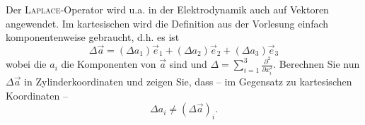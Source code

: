 \begin{atiTask}[
  title = Laplaceoperator in 3 Dimensionen
]

Der \textsc{Laplace}-Operator wird u.a. in der Elektrodynamik auch auf Vektoren angewendet. Im kartesischen wird die Definition aus der Vorlesung einfach komponentenweise gebraucht, d.h. es ist
\[
\Delta\vec{a}=(\Delta a_1)\vec{e}_1+(\Delta a_2)\vec{e}_2+(\Delta a_3)\vec{e}_3
\]
wobei die $a_i$ die Komponenten von $\vec{a}$ sind und $\Delta=\sum_{i=1}^3\frac{\partial^2}{\partial x_i^2}$.
Berechnen Sie nun $\Delta \vec{a}$ in Zylinderkoordinaten und zeigen Sie, dass -- im Gegensatz zu kartesischen Koordinaten --
\[
\Delta a_i\neq (\Delta \vec{a})_i.
\]


\end{atiTask}

% 	
